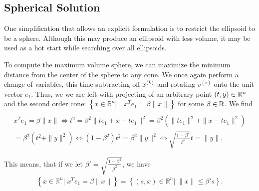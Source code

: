%             
% 


\subsection{Spherical Solution}
\label{spherical_solution_description}

One simplification that allows an explicit formulation is to restrict the ellipsoid to be a sphere.
Although this may produce an ellipsoid with less volume, it may be used as a hot start while searching over all ellipsoids.

To compute the maximum volume sphere, we can maximize the minimum distance from the center of the sphere to any cone.
We once again perform a change of variables, this time subtracting off $x^{(k)}$ and rotating $v^{(i)}$ onto the unit vector $e_1$.
Thus, we we are left with projecting of an arbitrary point $(t, y) \in \mathbb R^n$ and the second order cone:
$\left\{ x \in \mathbb R^n | \quad x^Te_1 = \beta \|x\| \right\}$ 
for some $\beta \in \mathbb R$.
We find
\begin{align*}
 \\
x^Te_1 = \beta \|x\| 
 \Longleftrightarrow t^2 = \beta^2 \|te_1  + x - t e_1\|^2 
  = \beta^2 \left(\|te_1\|^2  + \|x - t e_1\|^2\right) \\
= \beta^2 \left(t^2  + \|y\|^2 \right) 
 \Longleftrightarrow (1 - \beta^2)t^2 = \beta^2 \|y\|^2 
 \Longleftrightarrow \sqrt{\frac{1 - \beta^2}{ \beta^2}} t = \|y\|.
\end{align*}


This means, that if we let $\beta' = \sqrt{\frac{1 - \beta^2}{\beta^2}}$, we have
\begin{align*}
\left\{ x \in \mathbb R^n | \; x^Te_1 = \beta \|x\| \right\} = \left \{(s, x)\in \mathbb R^n | \; \|x\| \le \beta' s \right\}.
\end{align*}

